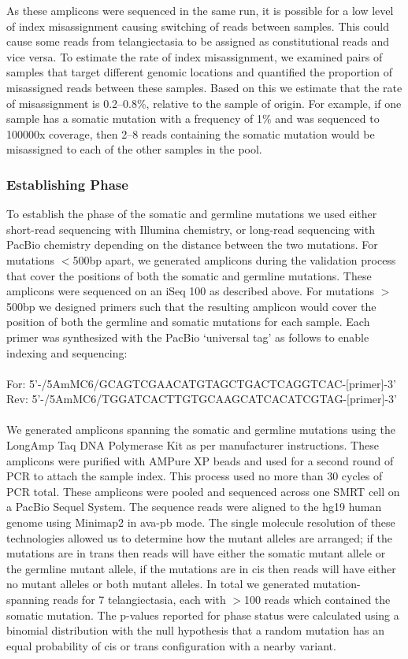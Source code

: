 	As these amplicons were sequenced in the same run, it is possible for a low level of index misassignment causing switching of reads between samples. This could cause some reads from telangiectasia to be assigned as constitutional reads and vice versa. To estimate the rate of index misassignment, we examined pairs of samples that target different genomic locations and quantified the proportion of misassigned reads between these samples. Based on this we estimate that the rate of misassignment is 0.2--0.8\%, relative to the sample of origin. For example, if one sample has a somatic mutation with a frequency of 1\% and was sequenced to 100000x coverage, then 2--8 reads containing the somatic mutation would be misassigned to each of the other samples in the pool.

\subsubsection{Establishing Phase}
To establish the phase of the somatic and germline mutations we used either short-read sequencing with Illumina chemistry, or long-read sequencing with PacBio chemistry depending on the distance between the two mutations. For mutations $<$500bp apart, we generated amplicons during the validation process that cover the positions of both the somatic and germline mutations. These amplicons were sequenced on an iSeq 100 as described above. 
	For mutations $>$500bp we designed primers such that the resulting amplicon would cover the position of both the germline and somatic mutations for each sample. Each primer was synthesized with the PacBio ‘universal tag’ as follows to enable indexing and sequencing: 
	\\
	\\For: 5'-/5AmMC6/GCAGTCGAACATGTAGCTGACTCAGGTCAC-[primer]-3'
	\\Rev: 5'-/5AmMC6/TGGATCACTTGTGCAAGCATCACATCGTAG-[primer]-3'
	\\\\
	We generated amplicons spanning the somatic and germline mutations using the LongAmp Taq DNA Polymerase Kit as per manufacturer instructions. These amplicons were purified with AMPure XP beads and used for a second round of PCR to attach the sample index. This process used no more than 30 cycles of PCR total. These amplicons were pooled and sequenced across one SMRT cell on a PacBio Sequel System. The sequence reads were aligned to the hg19 human genome using Minimap2 in ava-pb mode.
The single molecule resolution of these technologies allowed us to determine how the mutant alleles are arranged; if the mutations are in trans then reads will have either the somatic mutant allele or the germline mutant allele, if the mutations are in cis then reads will have either no mutant alleles or both mutant alleles. In total we generated mutation-spanning reads for 7 telangiectasia, each with $>$100 reads which contained the somatic mutation. The p-values reported for phase status were calculated using a binomial distribution with the null hypothesis that a random mutation has an equal probability of cis or trans configuration with a nearby variant. 
